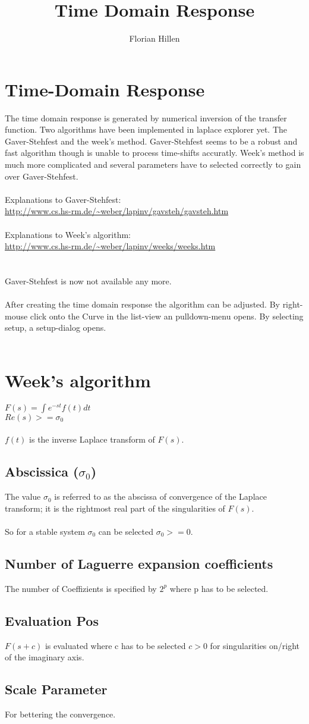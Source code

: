 \documentclass[a4paper,12pt]{article}
\title{Time Domain Response}
\author{Florian Hillen}
\begin{document}
\section{Time-Domain Response}
The time domain response is generated by numerical inversion of the transfer function. 
Two algorithms have been implemented in laplace explorer yet. The Gaver-Stehfest and the week's method.
Gaver-Stehfest seems to be a robust and fast algorithm though is unable to process time-shifts accuratly.
Week's method is much more complicated and several parameters have to selected correctly to gain 
over Gaver-Stehfest.\\\\
Explanations to Gaver-Stehfest:\\
\url{http://www.cs.hs-rm.de/~weber/lapinv/gavsteh/gavsteh.htm}\\\\
Explanations to Week's algorithm:\\
\url{http://www.cs.hs-rm.de/~weber/lapinv/weeks/weeks.htm}\\\\
\\
Gaver-Stehfest is now not available any more.\\\\
After creating the time domain response the algorithm can be adjusted. By right-mouse click onto the Curve in
the list-view an pulldown-menu opens. By selecting setup, a setup-dialog opens.\\\\
\section{Week's algorithm}
$F(s) = \int e^{-st}f(t)dt$\\
$Re(s)>=\sigma_0$\\\\
$f(t)$ is the inverse Laplace transform of $F(s)$.  

\subsection{Abscissica ($\sigma_0$)}
The value $\sigma_0$ is referred to as the abscissa of 
convergence of the Laplace transform; it is the rightmost real part of the singularities of $F(s)$.\\\\
So for a stable system $\sigma_0$ can be selected $\sigma_0 >= 0$.
\subsection{Number of Laguerre expansion coefficients}
The number of Coeffizients is specified by $2^p$ where p has to be selected.
\subsection{Evaluation Pos}
$F(s + c)$ is evaluated where c has to be selected $c>0$ for singularities on/right of the imaginary axis.
\subsection{Scale Parameter}
For bettering the convergence.
\end{document}
